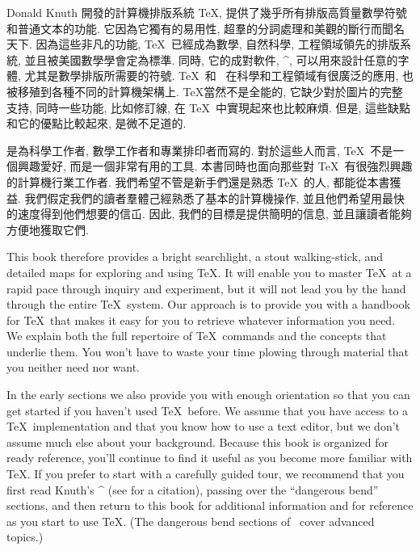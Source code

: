 


{\tighten
Donald Knuth 開發的計算機排版系統 \TeX, 
提供了幾乎所有排版高質量數學符號和普通文本的功能.
它因為它獨有的易用性, 超羣的分詞處理和美觀的斷行而聞名天下.
因為這些非凡的功能, \TeX\ 已經成為數學, 自然科學, 工程領域領先的排版系統, 
並且被美國數學學會定為標準. 
同時, 它的成對軟件, ^{\Metafont}, 可以用來設計任意的字體, 尤其是數學排版所需要的符號.
\TeX\ 和 \Metafont\ 在科學和工程領域有很廣泛的應用, 
也被移殖到各種不同的計算機架構上.
\TeX 當然不是全能的, 它缺少對於圖片的完整支持, 
同時一些功能, 比如修訂線, 在 \TeX\ 中實現起來也比較麻煩.
但是, 這些缺點和它的優點比較起來, 是微不足道的.
\par}

\thisbook\/ 是為科學工作者, 數學工作者和專業排印者而寫的.
對於這些人而言, \TeX\ 不是一個興趣愛好, 而是一個非常有用的工具.
本書同時也面向那些對 \TeX\ 有很強烈興趣的計算機行業工作者.
我們希望不管是新手們還是熟悉 \TeX\ 的人, 都能從本書獲益.
我們假定我們的讀者羣體己經熟悉了基本的計算機操作, 
並且他們希望用最快的速度得到他們想要的信屲.
因此, 我們的目標是提供簡明的信息, 並且讓讀者能夠方便地獲取它們.

{\tighten This book therefore provides a bright searchlight, a stout
walking-stick, and detailed maps for exploring and using \TeX.  It will
enable you to master \TeX\ at a rapid pace through inquiry and
experiment, but it will not lead you by the hand through the entire
\TeX\ system.  Our approach is to provide you with a handbook for \TeX\
that makes it easy for you to retrieve whatever information you need.
We explain both the full repertoire of \TeX\ commands and the concepts
that underlie them.  You won't have to waste your time plowing through
material that you neither need nor want.  \par}

In the early sections we also provide you with enough orientation so
that you can get started if you haven't used \TeX\ before.  We assume
that you have access to a \TeX\ implementation and that you know how to
use a text editor, but we don't assume much else about your background.
Because this book is organized for ready reference, you'll continue to
find it useful as you become more familiar with \TeX.  If you prefer to
start with a carefully guided tour, we recommend that you first read
Knuth's ^{\texbook} (see \xrefpg{resources} for a citation), passing
over the ``dangerous bend'' sections, and then return to this book for
additional information and for reference as you start to use \TeX.  (The
dangerous bend sections of \texbook\ cover advanced topics.)

